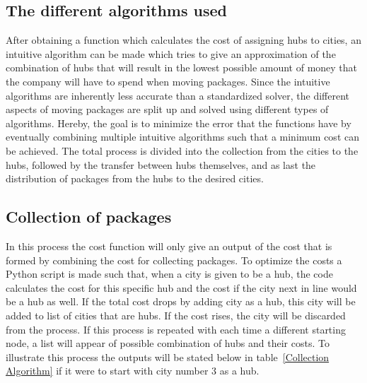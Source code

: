 \documentclass{article}
\begin{document}
        
    \subsection{The different algorithms used}
    
    After obtaining a function which calculates the cost of assigning hubs to cities, an intuitive algorithm can be made which tries to give an approximation of the combination of hubs that will result in the lowest possible amount of money that the company will have to spend when moving packages. 
    Since the intuitive algorithms are inherently less accurate than a standardized solver, the different aspects of moving packages are split up and solved using different types of algorithms. Hereby, the goal is to minimize the error that the functions have by eventually combining multiple intuitive algorithms such that a minimum cost can be achieved. The total process is divided into the collection from the cities to the hubs, followed by the transfer between hubs themselves, and as last the distribution of packages from the hubs to the desired cities. 
    \subsection{Collection of packages}  
    \label{Collection of packages}
    In this process the cost function will only give an output of the cost that is formed by combining the cost for collecting packages. To optimize the costs a Python script is made such that, when a city is given to be a hub, the code calculates the cost for this specific hub and the cost if the city next in line would be a hub as well. If the total cost drops by adding city as a hub, this city will be added to list of cities that are hubs. If the cost rises, the city will be discarded from the process. If this process is repeated with each time a different starting node, a list will appear of possible combination of hubs and their costs. To illustrate this process the outputs will be stated below in table~\ref{Collection Algorithm} if it were to start with city number 3 as a hub.
\end{document}
